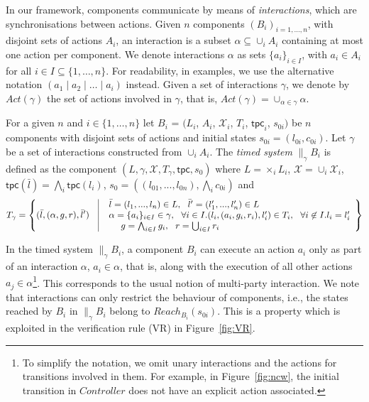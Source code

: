 \documentclass{LMCS}
\newcommand{\X}{\mathcal{X}}
\newcommand{\inv}{\mathsf{tpc}}
\newcommand{\reach}{\mathit{Reach}}
\newcommand{\cn}{\mathit{B}\xspace}
\newcommand{\ctn}{\mathit{Controller}}
\theoremstyle{plain}\newtheorem{remark}[thm]{Remark}
\theoremstyle{plain}\newtheorem{example}[thm]{Example}
\begin{document}
In our framework, components communicate by means of
\emph{interactions}, which are synchronisations between actions.
Given $n$ components $(\cn_i)_{i=1,\dots,n}$, with disjoint sets of actions
$A_i$, an interaction is a subset $\alpha \subseteq \cup_i A_i$
containing at most one action per component.  We denote interactions
$\alpha$ as sets $\{ a_i \}_{i \in I}$, with $a_i \in A_i$ for all $i
\in I \subseteq \{ 1, \ldots, n \}$. For readability, in examples, we
use the alternative notation $(a_1 \mid a_2 \mid \dots \mid a_i)$
instead. Given a set of interactions $\gamma$, we denote by
$Act(\gamma)$ the set of actions involved in $\gamma$, that is,
$Act(\gamma) = \cup_{\alpha \in \gamma} \alpha$.

\begin{defi} 
For a given $n$ and $i \in \{1,\dots, n\}$ let $\cn_i$ = $(L_i$,
$A_i$, $\X_i$, $T_i$, $\inv_i$, $s_{0i})$ be $n$ components with
disjoint sets of actions and initial states $s_{0i} = (l_{0i},
c_{0i})$.  Let $\gamma$ be a set of interactions constructed from
$\cup_i A_i$.  The \emph{timed system} $\|_\gamma\cn_i$ is defined as
the component $(L,\gamma,\X,T_{\gamma},\inv,s_0)$ where $L = \times_i
L_i$, $\X = \cup_i \X_i$, $\inv(\bar{l})=\bigwedge_i\inv(l_i)$,
$s_0=((l_{01}, ..., l_{0n}), \bigwedge_i c_{0i})$ and
  $$T_\gamma = \left\{ (\bar{l}, (\alpha,g,r), \bar{l}') ~~~ \begin{array}{| l} 
      ~~ \bar{l} = (l_1,..., l_n) \in L, ~~\bar{l}' = (l'_1, ..., l'_n) \in L \\
      ~~ \alpha = \{a_i\}_{i\in I} \in \gamma,
      ~~ \forall i\in I. (l_i, (a_i,g_i,r_i), l'_i) \in T_i, 
      ~~ \forall i\not\in I. l_i = l'_i \\ 
      ~~ ~~ ~~ g = \bigwedge_{i\in I}g_i, ~~r = \bigcup_{i\in I} r_i
  \end{array}\right\}$$
\end{defi}

In the timed system $\|_\gamma \cn_i$, a component $\cn_i$ can execute
an action $a_i$ only as part of an interaction $\alpha$, $a_i \in
\alpha$, that is, along with the execution of all other actions $a_j
\in \alpha$\footnote{To simplify the notation, we omit unary interactions and the
  actions for transitions involved in them. For example, in
  Figure~\ref{fig:ncw}, the initial transition in $\ctn$ does not have
  an explicit action associated.}. This corresponds to the usual notion of multi-party
interaction. We note that interactions can only restrict the behaviour
of components, i.e., the states reached by $\cn_i$ in $\|_\gamma
\cn_i$ belong to $\reach_{B_i}( s_{0i})$. This is a property which is
exploited in the verification rule (VR) in Figure~\ref{fig:VR}. 
\end{document}
